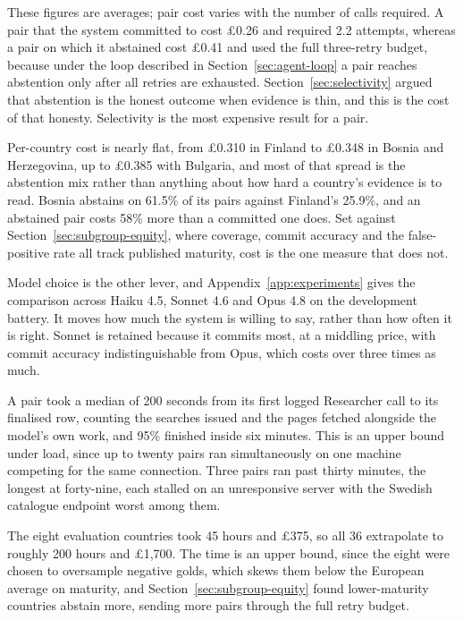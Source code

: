 These figures are averages; pair cost varies with the number of calls required. A pair that the system committed to cost \pounds{}0.26 and required 2.2 attempts, whereas a pair on which it abstained cost \pounds{}0.41 and used the full three-retry budget, because under the loop described in Section~\ref{sec:agent-loop} a pair reaches abstention only after all retries are exhausted. Section~\ref{sec:selectivity} argued that abstention is the honest outcome when evidence is thin, and this is the cost of that honesty. Selectivity is the most expensive result for a pair.

Per-country cost is nearly flat, from \pounds{}0.310 in Finland to \pounds{}0.348 in Bosnia and Herzegovina, up to \pounds{}0.385 with Bulgaria, and most of that spread is the abstention mix rather than anything about how hard a country's evidence is to read. Bosnia abstains on 61.5\% of its pairs against Finland's 25.9\%, and an abstained pair costs 58\% more than a committed one does. Set against Section~\ref{sec:subgroup-equity}, where coverage, commit accuracy and the false-positive rate all track published maturity, cost is the one measure that does not.

Model choice is the other lever, and Appendix~\ref{app:experiments} gives the comparison across Haiku 4.5, Sonnet 4.6 and Opus 4.8 on the development battery. It moves how much the system is willing to say, rather than how often it is right. Sonnet is retained because it commits most, at a middling price, with commit accuracy indistinguishable from Opus, which costs over three times as much.

A pair took a median of 200 seconds from its first logged Researcher call to its finalised row, counting the searches issued and the pages fetched alongside the model's own work, and 95\% finished inside six minutes. This is an upper bound under load, since up to twenty pairs ran simultaneously on one machine competing for the same connection. Three pairs ran past thirty minutes, the longest at forty-nine, each stalled on an unresponsive server with the Swedish catalogue endpoint worst among them.

The eight evaluation countries took 45 hours and \pounds{}375, so all 36 extrapolate to roughly 200 hours and \pounds{}1,700. The time is an upper bound, since the eight were chosen to oversample negative golds, which skews them below the European average on maturity, and Section~\ref{sec:subgroup-equity} found lower-maturity countries abstain more, sending more pairs through the full retry budget.


